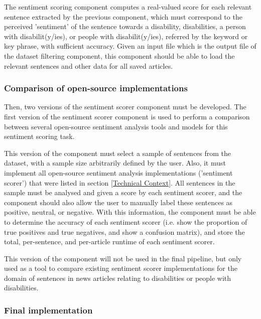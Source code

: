 \documentclass{report}
\begin{document}
The sentiment scoring component computes a real-valued score for each relevant sentence extracted by the previous component, which must correspond to the perceived 'sentiment' of the sentence towards a disability, disabilities, a person with disabilit(y/ies), or people with disabilit(y/ies), referred by the keyword or key phrase, with sufficient accuracy.
Given an input file which is the output file of the dataset filtering component, this component should be able to load the relevant sentences and other data for all saved articles.

\subsubsection{Comparison of open-source implementations}

Then, two versions of the sentiment scorer component must be developed.
The first version of the sentiment scorer component is used to perform a comparison between several open-source sentiment analysis tools and models for this sentiment scoring task.

This version of the component must select a sample of sentences from the dataset, with a sample size arbitrarily defined by the user.
Also, it must implement all open-source sentiment analysis implementations ('sentiment scorer') that were listed in section \ref{Technical Context}.
All sentences in the sample must be analysed and given a score by each sentiment scorer, and the component should also allow the user to manually label these sentences as positive, neutral, or negative.
With this information, the component must be able to determine the accuracy of each sentiment scorer (i.e. show the proportion of true positives and true negatives, and show a confusion matrix), and store the total, per-sentence, and per-article runtime of each sentiment scorer.

This version of the component will not be used in the final pipeline, but only used as a tool to compare existing sentiment scorer implementations for the domain of sentences in news articles relating to disabilities or people with disabilities.

\subsubsection{Final implementation}
\end{document}
